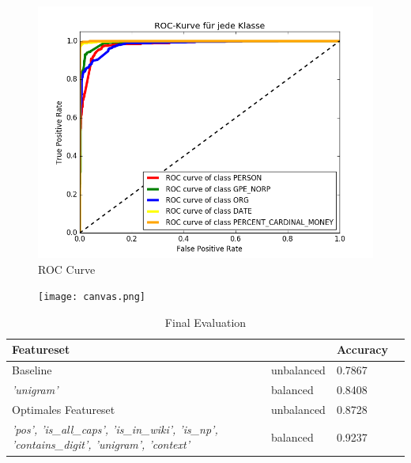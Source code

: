 \documentclass[a4paper, 11pt]{article}
\begin{document}
\begin{figure}
	\includegraphics[scale=0.5]{roc_curve.png}
	\caption{ROC Curve}
	\label{img:roccurve}
\end{figure}
\begin{figure}
	\texttt{[image: canvas.png]}
	\caption{}
	\label{img:canvas}
\end{figure}
\begin{table}
					\centering
					\begin{tabular}{llll}
						Featureset & & Accuracy\\
						\toprule
						Baseline & unbalanced & 0.7867\\
						\small\color{blue}\textit{'unigram'} & balanced & 0.8408\\
						Optimales Featureset	 & unbalanced & 0.8728\\
						\small\color{blue}\textit{'pos', 'is\_all\_caps', 'is\_in\_wiki', 'is\_np', 'contains\_digit', 'unigram', 'context'}		 & balanced & 0.9237\\
						\bottomrule
					\end{tabular}
					\caption{Final Evaluation}
					\label{tab:Evaluation}
\end{table}
\end{document}
